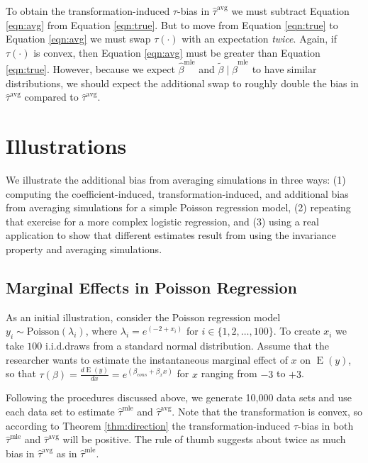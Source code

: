 \documentclass[11pt]{article}
\DeclareMathOperator*{\E}{\text{E}}
\begin{document}
To obtain the transformation-induced $\tau$-bias in $\hat{\tau}^\text{avg}$ we must subtract Equation \ref{eqn:avg} from Equation \ref{eqn:true}.
But to move from Equation \ref{eqn:true} to Equation \ref{eqn:avg} we must swap $\tau(\cdot)$ with an expectation \emph{twice}.
Again, if $\tau(\cdot)$ is convex, then Equation \ref{eqn:avg} must be greater than Equation \ref{eqn:true}.
However, because we expect $\hat{\beta}^\text{mle}$ and $\tilde{\beta} \mid \hat{\beta}^\text{mle}$ to have similar distributions, we should expect the additional swap to roughly double the bias in $\hat{\tau}^\text{avg}$ compared to $\hat{\tau}^\text{avg}$.

\section*{Illustrations}

We illustrate the additional bias from averaging simulations in three ways: (1) computing the coefficient-induced, transformation-induced, and additional bias from averaging simulations for a simple Poisson regression model, (2) repeating that exercise for a more complex logistic regression, and (3) using a real application to show that different estimates result from using the invariance property and averaging simulations.

\subsection*{Marginal Effects in Poisson Regression}

As an initial illustration, consider the Poisson regression model $y_i \sim \text{Poisson}(\lambda_i)$, where $\lambda_i = e^{(-2 + x_i)}$ for $i \in \{1, 2,\ldots, 100\}$.
To create $x_i$ we take $100$ i.i.d.\@ draws from a standard normal distribution.
Assume that the researcher wants to estimate the instantaneous marginal effect of $x$ on $\E(y)$, so that $\tau(\beta) = \frac{d \E (y)}{dx} = e^{(\beta_{cons} + \beta_x x)}$ for $x$ ranging from $-3$ to $+3$.

Following the procedures discussed above, we generate 10,000 data sets and use each data set to estimate $\hat{\tau}^\text{mle}$ and $\hat{\tau}^\text{avg}$.
Note that the transformation is convex, so according to Theorem \ref{thm:direction} the transformation-induced $\tau$-bias in both $\hat{\tau}^\text{mle}$ and $\hat{\tau}^\text{avg}$ will be positive.
The rule of thumb suggests about twice as much bias in $\hat{\tau}^\text{avg}$ as in $\hat{\tau}^\text{mle}$.
\end{document}
